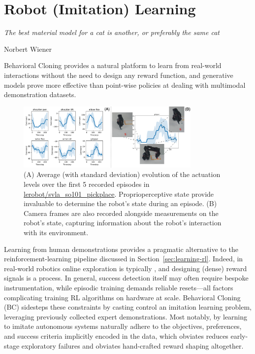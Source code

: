 \section{Robot (Imitation) Learning}
\label{sec:learning-bc-single}

\epigraph{\emph{The best material model for a cat is another, or preferably the same cat}}{Norbert Wiener}

\begin{tldr}
Behavioral Cloning provides a natural platform to learn from real-world interactions without the need to design any reward function, and generative models prove more effective than point-wise policies at dealing with multimodal demonstration datasets.
\end{tldr}

\begin{figure}
    \centering
    \includegraphics[width=0.8\textwidth]{figures/ch4/ch4-bc-trajectories.png}
    \caption{(A) Average (with standard deviation) evolution of the actuation levels over the first 5 recorded episodes in \url{lerobot/svla_so101_pickplace}. Proprioperceptive state provide invaluable to determine the robot's state during an episode. (B) Camera frames are also recorded alongside measurements on the robot's state, capturing information about the robot's interaction with its environment.}
    \label{fig:ch4-bc-trajectories}
\end{figure}

Learning from human demonstrations provides a pragmatic alternative to the reinforcement-learning pipeline discussed in Section~\ref{sec:learning-rl}.
Indeed, in real-world robotics online exploration is typically , and designing (dense) reward signals is a  process.
In general, success detection itself may often require bespoke instrumentation, while episodic training demands reliable resets---all factors complicating training RL algorithms on hardware at scale.
Behavioral Cloning (BC) sidesteps these constraints by casting control an imitation learning problem, leveraging previously collected expert demonstrations.
Most notably, by learning to imitate autonomous systems naturally adhere to the objectives, preferences, and success criteria implicitly encoded in the data, which obviates reduces early-stage exploratory failures and obviates hand-crafted reward shaping altogether.

